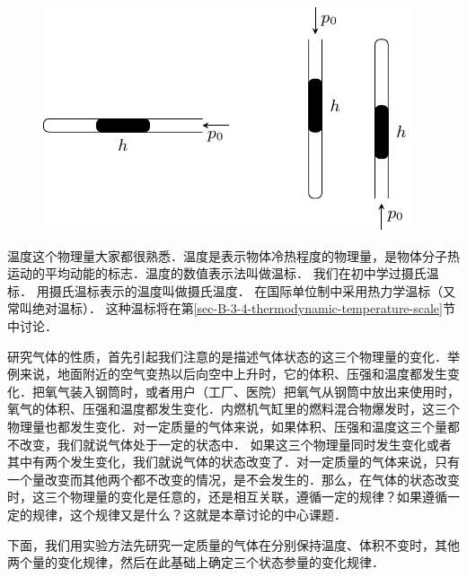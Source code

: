 \begin{figure}[htbp]
    \centering
    \includegraphics{fig/B/3-2.pdf}
    \caption{}\label{fig_B_3-2}
\end{figure}

温度这个物理量大家都很熟悉．温度是表示物体冷热程度的物理量，是物体分子热运动的平均动能的标志．温度的数值表示法叫做温标．
我们在初中学过摄氏温标．
用摄氏温标表示的温度叫做摄氏温度．
在国际单位制中采用热力学温标（又常叫绝对温标）．
这种温标将在第\ref{sec-B-3-4-thermodynamic-temperature-scale}节中讨论．

研究气体的性质，首先引起我们注意的是描述气体状态的这三个物理量的变化．举例来说，地面附近的空气变热以后向空中上升时，它的体积、压强和温度都发生变化．把氧气装入钢筒时，或者用户（工厂、医院）把氧气从钢筒中放出来使用时，氧气的体积、压强和温度都发生变化．内燃机气缸里的燃料混合物爆发时，这三个物理量也都发生变化．对一定质量的气体来说，如果体积、压强和温度这三个量都不改变，我们就说气体处于一定的状态中．
如果这三个物理量同时发生变化或者其中有两个发生变化，我们就说气体的状态改变了．对一定质量的气体来说，只有一个量改变而其他两个都不改变的情况，是不会发生的．那么，在气体的状态改变时，这三个物理量的变化是任意的，还是相互关联，遵循一定的规律？如果遵循一定的规律，这个规律又是什么？这就是本章讨论的中心课题．

下面，我们用实验方法先研究一定质量的气体在分别保持温度、体积不变时，其他两个量的变化规律，然后在此基础上确定三个状态参量的变化规律．


